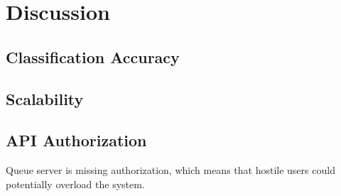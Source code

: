 \chapter{Discussion}\label{cha:disc}

\section{Classification Accuracy}

\section{Scalability}

\section{API Authorization}\label{disc:auth}
Queue server is missing authorization, which means that hostile users could
potentially overload the system.
